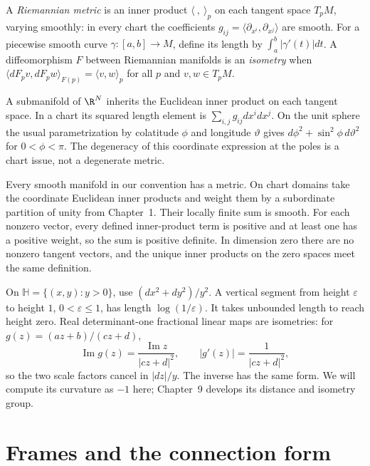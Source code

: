 \begin{definition}
A \emph{Riemannian metric} is an inner product $\langle\ ,\ \rangle_p$ on each tangent space $T_pM$, varying smoothly: in every chart the coefficients $g_{ij}=\langle\partial_{x^i},\partial_{x^j}\rangle$ are smooth. For a piecewise smooth curve $\gamma:[a,b]\to M$, define its length by $\int_a^b|\gamma'(t)|dt$. A diffeomorphism $F$ between Riemannian manifolds is an \emph{isometry} when
$\langle dF_pv,dF_pw\rangle_{F(p)}=\langle v,w\rangle_p$ for all $p$ and $v,w\in T_pM$.
\end{definition}

A submanifold of $\R^N$ inherits the Euclidean inner product on each tangent space. In a chart its squared length element is $\sum_{i,j}g_{ij}dx^i dx^j$. On the unit sphere the usual parametrization by colatitude $\phi$ and longitude $\vartheta$ gives $d\phi^2+\sin^2\phi\,d\vartheta^2$ for $0<\phi<\pi$. The degeneracy of this coordinate expression at the poles is a chart issue, not a degenerate metric.

Every smooth manifold in our convention has a metric. On chart domains take the coordinate Euclidean inner products and weight them by a subordinate partition of unity from Chapter~1. Their locally finite sum is smooth. For each nonzero vector, every defined inner-product term is positive and at least one has a positive weight, so the sum is positive definite. In dimension zero there are no nonzero tangent vectors, and the unique inner products on the zero spaces meet the same definition.

\begin{example}\label{ex:halfplane}
On $\mathbb H=\{(x,y):y>0\}$, use $(dx^2+dy^2)/y^2$. A vertical segment from height $\varepsilon$ to height $1$, $0<\varepsilon\le1$, has length $\log(1/\varepsilon)$. It takes unbounded length to reach height zero. Real determinant-one fractional linear maps are isometries: for $g(z)=(az+b)/(cz+d)$,
\[
\operatorname{Im}g(z)=\frac{\operatorname{Im}z}{|cz+d|^2},\qquad
|g'(z)|=\frac1{|cz+d|^2},
\]
so the two scale factors cancel in $|dz|/y$. The inverse has the same form. We will compute its curvature as $-1$ here; Chapter~9 develops its distance and isometry group.
\end{example}

\section{Frames and the connection form}

